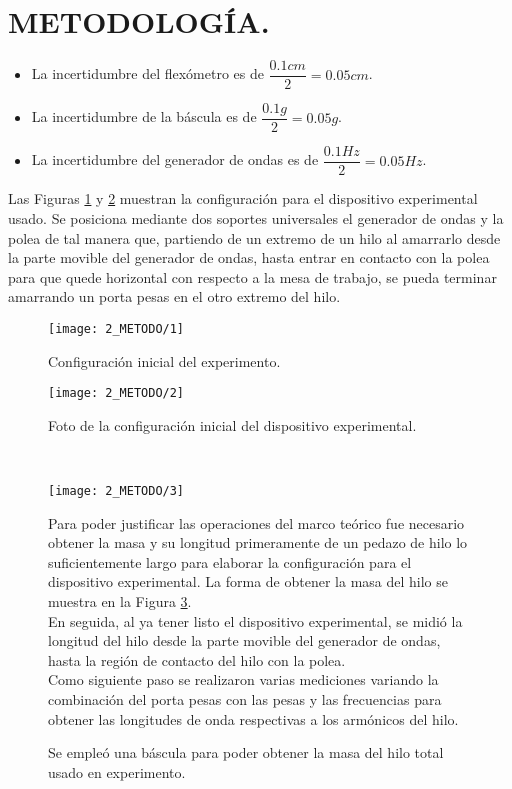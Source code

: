 \documentclass[10pt,a4paper]{article}
\begin{document}
\section{METODOLOGÍA.} %
\label{sec:metodologia}
\begin{itemize}
	\item La incertidumbre del flexómetro es de $ \dfrac{0.1cm}{2}=0.05cm $.
	\item La incertidumbre de la báscula es de $ \dfrac{0.1 g}{2}=0.05 g $.
	\item La incertidumbre del generador de ondas es de $ \dfrac{0.1 Hz}{2}=0.05 Hz $.
\end{itemize}
Las Figuras \ref{fig:met1} y \ref{fig:met2} muestran la configuración para el dispositivo experimental usado.
Se posiciona mediante dos soportes universales el generador de ondas y la polea de tal manera que, partiendo de un extremo de un hilo al amarrarlo desde la parte movible del generador de ondas, hasta entrar en contacto con la polea para que quede horizontal con respecto a la mesa de trabajo, se pueda terminar amarrando un porta pesas en el otro extremo del hilo.
\begin{figure}[hbt!]
	\centering
	\texttt{[image: 2\_METODO/1]}
	\caption{Configuración inicial del experimento.}
	\label{fig:met1}
\end{figure}
\begin{figure}[hbt!]
	\centering
	\texttt{[image: 2\_METODO/2]}
	\caption{Foto de la configuración inicial del dispositivo experimental.}
	\label{fig:met2}
\end{figure}\\
\begin{figure}[hbt!]
\begin{minipage}{0.4\linewidth}
	\texttt{[image: 2\_METODO/3]}
	\caption{Se empleó una báscula para poder obtener la masa del hilo total usado en experimento.}
	\label{fig:met3}
\end{minipage}
\begin{minipage}{0.6\linewidth}
	Para poder justificar las operaciones del marco teórico fue necesario obtener la masa y su longitud primeramente de un pedazo de hilo lo suficientemente largo para elaborar la configuración para el dispositivo experimental.
	La forma de obtener la masa del hilo se muestra en la Figura \ref{fig:met3}. \\[2mm]
	En seguida, al ya tener listo el dispositivo experimental, se midió la longitud del hilo desde la parte movible del generador de ondas, hasta la región de contacto del hilo con la polea. \\[2mm]
	Como siguiente paso se realizaron varias mediciones variando la combinación del porta pesas con las pesas y las frecuencias para obtener las longitudes de onda respectivas a los armónicos del hilo.
\end{minipage}
\end{figure}\\
\end{document}
